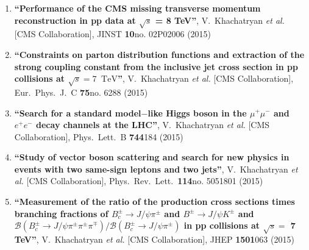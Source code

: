 \begin{enumerate}
\item%
{\bf ``Performance of the CMS missing transverse momentum reconstruction in pp data at $\sqrt{s}$ = 8 TeV''}, 
  V.~Khachatryan {\it et al.}  [CMS Collaboration], 
JINST {\bf 10}no. 02P02006 (2015) %


\item%
{\bf ``Constraints on parton distribution functions and extraction of the strong coupling constant from the inclusive jet cross section in pp collisions at $\sqrt{s} = 7$ $\,\text {TeV}$''}, 
  V.~Khachatryan {\it et al.}  [CMS Collaboration], 
Eur.\ Phys.\ J.\ C {\bf 75}no. 6288 (2015) %


\item%
{\bf ``Search for a standard model$-$like Higgs boson in the $\mu ^{+}\mu ^{-}$ and $e^{+}e^{-}$ decay channels at the LHC''}, 
  V.~Khachatryan {\it et al.}  [CMS Collaboration], 
Phys.\ Lett.\ B {\bf 744}184 (2015) %


\item%
{\bf ``Study of vector boson scattering and search for new physics in events with two same-sign leptons and two jets''}, 
  V.~Khachatryan {\it et al.}  [CMS Collaboration], 
Phys.\ Rev.\ Lett.\  {\bf 114}no. 5051801 (2015) %


\item%
{\bf ``Measurement of the ratio of the production cross sections times branching fractions of $B_{c}^{\pm} \to J/\psi \pi^{\pm}$ and $B^{\pm} \to J/\psi K^{\pm}$ and $\mathcal{B}(B_{c}^{\pm} \to J/\psi \pi^{\pm}\pi^{\pm}\pi^{\mp})/\mathcal{B}(B_{c}^{\pm} \to J/\psi \pi^{\pm})$ in pp collisions at $\sqrt{s} =$ 7 TeV''}, 
  V.~Khachatryan {\it et al.}  [CMS Collaboration], 
JHEP {\bf 1501}063 (2015) %



\end{enumerate}
